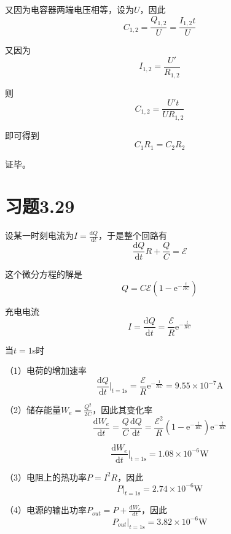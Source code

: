\documentclass{SCIS2020cn}
\begin{document}
又因为电容器两端电压相等，设为$U$，因此
\begin{equation}
    C_{1,2}=\frac{Q_{1,2}}{U}=\frac{I_{1,2}t}{U}
\end{equation}

又因为
\begin{equation}
    I_{1,2}=\frac{U'}{R_{1,2}}
\end{equation}

则
\begin{equation}
    C_{1,2}=\frac{U't}{UR_{1,2}}
\end{equation}

即可得到
\begin{equation}
    C_1R_1=C_2R_2
\end{equation}

证毕。

\section{习题3.29}
设某一时刻电流为$\displaystyle{}I=\frac{\text{d}Q}{\text{d}t}$，于是整个回路有
\begin{equation}
    \frac{\text{d}Q}{\text{d}t}R+\frac{Q}{C}=\mathscr{E}
\end{equation}

这个微分方程的解是
\begin{equation}
    Q=C\mathscr{E}(1-\text{e}^{-\frac{t}{RC}})
\end{equation}

充电电流
\begin{equation}
    I=\frac{\text{d}Q}{\text{d}t}=\frac{\mathscr{E}}{R}\text{e}^{-\frac{t}{RC}}
\end{equation}

当$t=1$s时

（1）电荷的增加速率
\begin{equation}
    \frac{\text{d}Q}{\text{d}t}|_{t=1\text{s}}=\frac{\mathscr{E}}{R}\text{e}^{-\frac{1}{RC}}=9.55×10^{-7}\text{A}
\end{equation}

（2）储存能量$W_e=\frac{Q^2}{2C}$，因此其变化率
\begin{equation}
    \frac{\text{d}W_e}{\text{d}t}=\frac{Q}{C}\frac{\text{d}Q}{\text{d}t}=\frac{\mathscr{E}^2}{R}(1-\text{e}^{-\frac{t}{RC}})\text{e}^{-\frac{t}{RC}}
\end{equation}

\begin{equation}
    \frac{\text{d}W_e}{\text{d}t}|_{t=1\text{s}}=1.08×10^{-6}\text{W}
\end{equation}

（3）电阻上的热功率$P=I^2R$，因此
\begin{equation}
    P|_{t=1\text{s}}=2.74×10^{-6}\text{W}
\end{equation}

（4）电源的输出功率$P_{out}=P+\frac{\text{d}W_e}{\text{d}t}$，因此
\begin{equation}
    P_{out}|_{t=1\text{s}}=3.82×10^{-6}\text{W}
\end{equation}
\end{document}
